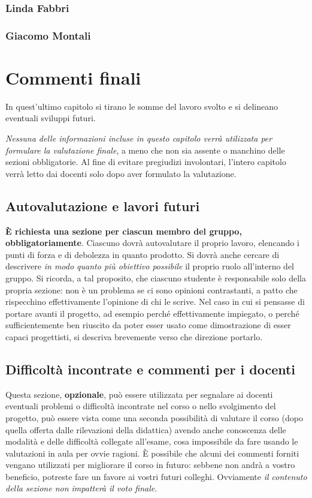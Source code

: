 \documentclass[a4paper,12pt]{report}
\begin{document}
\subsection{Linda Fabbri}



\subsection{Giacomo Montali}

\chapter{Commenti finali}

In quest'ultimo capitolo si tirano le somme del lavoro svolto e si delineano eventuali sviluppi
futuri.

\textit{Nessuna delle informazioni incluse in questo capitolo verrà utilizzata per formulare la valutazione finale}, a meno che non sia assente o manchino delle sezioni obbligatorie.
%
Al fine di evitare pregiudizi involontari, l'intero capitolo verrà letto dai docenti solo dopo aver formulato la valutazione.

\section{Autovalutazione e lavori futuri}

\textbf{È richiesta una sezione per ciascun membro del gruppo, obbligatoriamente}.
%
Ciascuno dovrà autovalutare il proprio lavoro, elencando i punti di forza e di debolezza in quanto prodotto.
Si dovrà anche cercare di descrivere \emph{in modo quanto più obiettivo possibile} il proprio ruolo all'interno del gruppo.
Si ricorda, a tal proposito, che ciascuno studente è responsabile solo della propria sezione: non è un problema se ci sono opinioni contrastanti, a patto che rispecchino effettivamente l'opinione di chi le scrive.
Nel caso in cui si pensasse di portare avanti il progetto, ad esempio perché effettivamente impiegato, o perché sufficientemente ben riuscito da poter esser usato come dimostrazione di esser capaci progettisti, si descriva brevemente verso che direzione portarlo.

\section{Difficoltà incontrate e commenti per i docenti}

Questa sezione, \textbf{opzionale}, può essere utilizzata per segnalare ai docenti eventuali problemi o difficoltà incontrate nel corso o nello svolgimento del progetto, può essere vista come una seconda possibilità di valutare il corso (dopo quella offerta dalle rilevazioni della didattica) avendo anche conoscenza delle modalità e delle difficoltà collegate all'esame, cosa impossibile da fare usando le valutazioni in aula per ovvie ragioni.
%
È possibile che alcuni dei commenti forniti vengano utilizzati per migliorare il corso in futuro: sebbene non andrà a vostro beneficio, potreste fare un favore ai vostri futuri colleghi.
%
Ovviamente \textit{il contenuto della sezione non impatterà il voto finale}.
\end{document}
